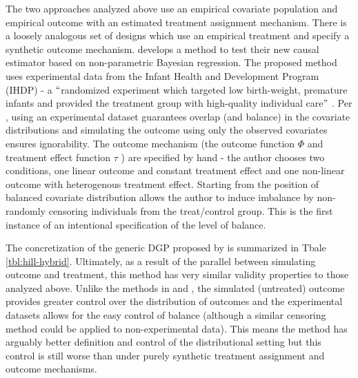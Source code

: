 \documentclass[../main.tex]{subfiles}
\begin{document}
\vspace{\baselineskip}
The two approaches analyzed above use an empirical covariate population and empirical outcome with an estimated treatment assignment mechanism. There is a loosely analogous set of designs which use an empirical treatment and specify a synthetic outcome mechanism. \textcite{Hill2011BayesianInference} develops a method to test their new causal estimator based on non-parametric Bayesian regression. The proposed method uses experimental data from the Infant Health and Development Program (IHDP) - a $``$randomized experiment which targeted low birth-weight, premature infants and provided the treatment group with high-quality individual care$"$ \parencite{Brooks-Gunn1991TheProgram}. Per \textcite{Hill2011BayesianInference}, using an experimental dataset guarantees overlap (and balance) in the covariate distributions and simulating the outcome using only the observed covariates ensures ignorability. The outcome mechanism (the outcome function  \(  \Phi  \) and treatment effect function  \(  \tau \) ) are specified by hand - the author chooses two conditions, one linear outcome and constant treatment effect and one non-linear outcome with heterogenous treatment effect. Starting from the position of balanced covariate distribution allows the author to induce imbalance by non-randomly censoring individuals from the treat/control group. This is the first instance of an intentional specification of the level of balance.\par


\vspace{\baselineskip}
The concretization of the generic DGP proposed by \textcite{Hill2011BayesianInference} is summarized in Tbale \ref{tbl:hill-hybrid}. Ultimately, as a result of the parallel between simulating outcome and treatment, this method has very similar validity properties to those analyzed above. Unlike the methods in \textcite{Huber2013TheScore} and \textcite{Knaus2018MachineEvidence}, the simulated (untreated) outcome provides greater control over the distribution of outcomes and the experimental datasets allows for the easy control of balance (although a similar censoring method could be applied to non-experimental data). This means the method has arguably better definition and control of the distributional setting but this control is still worse than under purely synthetic treatment assignment and outcome mechanisms.\par
\end{document}
